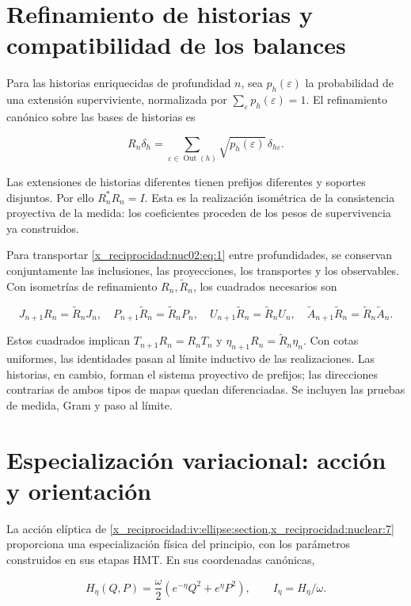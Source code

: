 \section{Refinamiento de historias y compatibilidad de los balances}

Para las historias enriquecidas de profundidad \(n\), sea \(p_h(\varepsilon)\) la probabilidad de una extensión superviviente, normalizada por \(\sum_\varepsilon p_h(\varepsilon)=1\). El refinamiento canónico sobre las bases de historias es

\[
R_n\delta_h=\sum_{\varepsilon\in\operatorname{Out}(h)}
\sqrt{p_h(\varepsilon)}\,\delta_{h\varepsilon}.
\]

Las extensiones de historias diferentes tienen prefijos diferentes y soportes disjuntos. Por ello \(R_n^*R_n=I\). Esta es la realización isométrica de la consistencia proyectiva de la medida: los coeficientes proceden de los pesos de supervivencia ya construidos.

Para transportar \eqref{x_reciprocidad:nuc02:eq:1} entre profundidades, se conservan conjuntamente las inclusiones, las proyecciones, los transportes y los observables. Con isometrías de refinamiento \(R_n,\widetilde R_n\), los cuadrados necesarios son

\[
J_{n+1}R_n=\widetilde R_nJ_n,\quad
P_{n+1}\widetilde R_n=\widetilde R_nP_n,\quad
U_{n+1}\widetilde R_n=\widetilde R_nU_n,\quad
\widetilde A_{n+1}\widetilde R_n=\widetilde R_n\widetilde A_n.
\]

Estos cuadrados implican \(T_{n+1}R_n=R_nT_n\) y \(\eta_{n+1}R_n=\widetilde R_n\eta_n\). Con cotas uniformes, las identidades pasan al límite inductivo de las realizaciones. Las historias, en cambio, forman el sistema proyectivo de prefijos; las direcciones contrarias de ambos tipos de mapas quedan diferenciadas. Se incluyen las pruebas de medida, Gram y paso al límite.

\section{Especialización variacional: acción y orientación}

La acción elíptica de \cref{x_reciprocidad:iv:ellipse:section,x_reciprocidad:nuclear:7} proporciona una especialización física del principio, con los parámetros construidos en sus etapas HMT. En sus coordenadas canónicas,

\[
H_\eta(Q,P)=\frac{\omega}{2}
\left(e^{-\eta}Q^2+e^\eta P^2\right),\qquad
I_\eta=H_\eta/\omega.
\]

